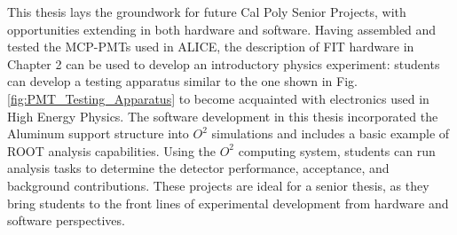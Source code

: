 This thesis lays the groundwork for future Cal Poly Senior Projects, with opportunities extending in both hardware and software. Having assembled and tested the MCP-PMTs used in ALICE, the description of FIT hardware in Chapter 2 can be used to develop an introductory physics experiment: students can develop a testing apparatus similar to the one shown in Fig. \ref{fig:PMT_Testing_Apparatus} to become acquainted with electronics used in High Energy Physics. The software development in this thesis incorporated the Aluminum support structure into $O^2$ simulations and includes a basic example of ROOT analysis capabilities. Using the $O^2$ computing system, students can run analysis tasks to determine the detector performance, acceptance, and background contributions. These projects are ideal for a senior thesis, as they bring students to the front lines of experimental development from hardware and software perspectives. 